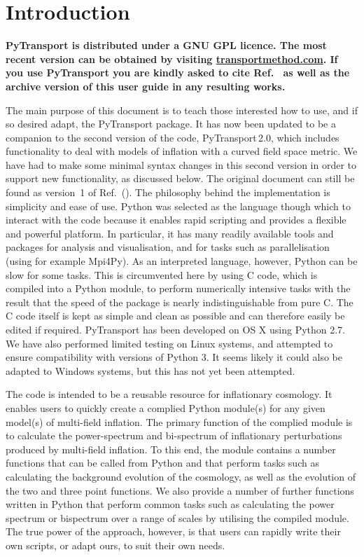 \documentclass[10pt,
amsmath,amssymb,
aps,prd,nofootinbib,eqsecnum,a4paper]{revtex4}
\newcommand{\CC}{C\nolinebreak\hspace{-.05em}\raisebox{.4ex}{\tiny\bf +}\nolinebreak\hspace{-.10em}\raisebox{.4ex}{\tiny\bf +}}
\def\CC{{C\nolinebreak[4]\hspace{-.05em}\raisebox{.4ex}{\tiny\bf ++}}}
\def\S{ }
\begin{document}
\section{Introduction}

\begin{framed}
{\bf \noindent PyTransport is distributed under a GNU GPL licence. The most recent version can be obtained by visiting \href{https://transportmethod.com}{transportmethod.com}. If you use PyTransport you are kindly asked to cite Ref.~\cite{xxx}  as well as the archive version of this user guide in any resulting works. }
\end{framed}

The main purpose of this document is to teach those interested how to use, and if so desired adapt, 
the PyTransport package. It has now been updated  to 
be a companion to the second version of the code, 
PyTransport\,2.0, which includes functionality to deal with models of inflation with a curved 
field space metric. We have had to make some minimal syntax changes in this second version 
in order to support new functionality, as discussed below. The original document 
can still be found as version~1 of Ref.~(\cite{Mulryne:2016mzv}).
The philosophy behind the implementation is simplicity and ease of use. 
Python was selected as the 
language though which to interact with the code because it enables rapid scripting and provides a flexible 
and powerful platform. 
In particular, it has many readily available tools and packages for analysis and visualisation, and for tasks such as parallelisation  (using for example Mpi4Py).  
As an interpreted language, however, Python can be slow for some tasks. This is circumvented here by 
using \CC \S  code, 
which is compiled into a Python module, to perform numerically intensive tasks with the result that the speed 
of the package is nearly indistinguishable from pure \CC. The \CC \S  code itself is kept as simple and 
clean as possible and can therefore easily be edited if required. PyTransport has been developed on 
OS X 
using Python 2.7. We have also performed limited testing on Linux systems, and 
attempted to ensure compatibility with versions of Python 3. 
It seems likely it could also be adapted to Windows systems, but this has not yet been attempted.

The code is intended to be a reusable resource for inflationary cosmology. It enables users to quickly create a 
complied Python module(s) for any given model(s) of multi-field inflation. 
The primary function of the complied module is to calculate the power-spectrum and bi-spectrum of inflationary 
perturbations produced by multi-field inflation. To this end,
the module contains a number 
functions that can be called from Python and that perform tasks such as calculating the background evolution 
of the cosmology, as well as the evolution of the two and three point functions. We also provide a number of further functions written in 
Python that perform common tasks such as calculating the power spectrum or bispectrum over a range of scales by utilising the 
compiled module.
The true power of the approach, however, is that users can rapidly write their own scripts, or adapt ours, to suit their own needs. 
\end{document}
